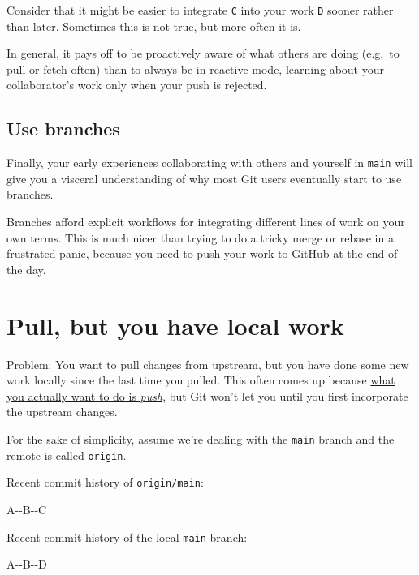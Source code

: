 \documentclass[
]{book}
\newenvironment{Shaded}{\begin{snugshade}}{\end{snugshade}}
\newcommand{\ExtensionTok}[1]{#1}
\begin{document}
Consider that it might be easier to integrate \texttt{C} into your work \texttt{D} sooner rather than later. Sometimes this is not true, but more often it is.

In general, it pays off to be proactively aware of what others are doing (e.g.~to pull or fetch often) than to always be in reactive mode, learning about your collaborator's work only when your push is rejected.

\section{Use branches}\label{use-branches}

Finally, your early experiences collaborating with others and yourself in \texttt{main} will give you a visceral understanding of why most Git users eventually start to use \hyperref[git-branches]{branches}.

Branches afford explicit workflows for integrating different lines of work on your own terms. This is much nicer than trying to do a tricky merge or rebase in a frustrated panic, because you need to push your work to GitHub at the end of the day.

\chapter{Pull, but you have local work}\label{pull-tricky}

Problem: You want to pull changes from upstream, but you have done some new work locally since the last time you pulled. This often comes up because \hyperref[push-rejected]{what you actually want to do is \emph{push}}, but Git won't let you until you first incorporate the upstream changes.

For the sake of simplicity, assume we're dealing with the \texttt{main} branch and the remote is called \texttt{origin}.

Recent commit history of \texttt{origin/main}:

\begin{Shaded}
\begin{Highlighting}[]
\ExtensionTok{A{-}{-}B{-}{-}C}
\end{Highlighting}
\end{Shaded}

Recent commit history of the local \texttt{main} branch:

\begin{Shaded}
\begin{Highlighting}[]
\ExtensionTok{A{-}{-}B{-}{-}D}
\end{Highlighting}
\end{Shaded}
\end{document}

